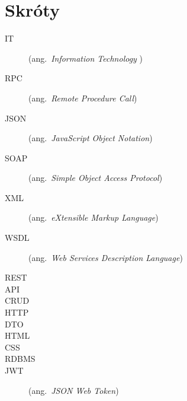 \chapter*{Skróty}\mbox{}
\label{sec:skroty}
\noindent
\begin{description}
  \item[IT] (ang.\ \emph{Information Technology })
	\item[RPC] (ang.\ \emph{Remote Procedure Call})
	\item[JSON] (ang.\ \emph{JavaScript Object Notation})
	\item[SOAP] (ang.\ \emph{Simple Object Access Protocol})
  \item[XML] (ang.\ \emph{eXtensible Markup Language})
  \item[WSDL] (ang.\ \emph{Web Services Description Language})
	\item[REST] 
	\item[API] 
	\item[CRUD] 
	\item[HTTP] 
	\item[DTO] 
	\item[HTML] 
	\item[CSS] 
	\item[RDBMS] 
	\item[JWT] (ang.\ \emph{JSON Web Token})
\end{description}
